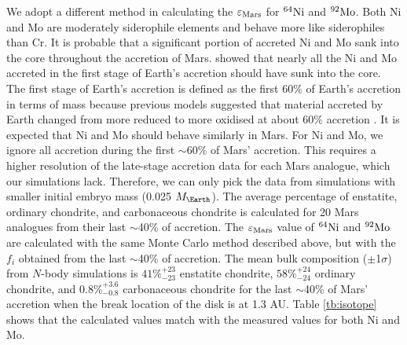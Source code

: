 \documentclass{aa}
\begin{document}
We adopt a different method in calculating the $\varepsilon_{\rm Mars}$ for $^{64} \rm Ni$ and $^{92} \rm Mo$. Both Ni and Mo are moderately siderophile elements and behave more like siderophiles than Cr. It is probable that a significant portion of accreted Ni and Mo sank into the core throughout the accretion of Mars. \cite{dauphas2017isotopic} showed that nearly all the Ni and Mo accreted in the first stage of Earth’s accretion should have sunk into the core. The first stage of Earth’s accretion is defined as the first 60$\%$ of Earth’s accretion in terms of mass because previous models suggested that material accreted by Earth changed from more reduced to more oxidised at about 60$\%$ accretion \citep{rubie2015accretion}. It is expected that Ni and Mo should behave similarly in Mars. For Ni and Mo, we ignore all accretion during the first $\sim$60\% of Mars’ accretion. This requires a higher resolution of the late-stage accretion data for each Mars analogue, which our simulations lack. Therefore, we can only pick the data from simulations with smaller initial embryo mass (0.025 $M_{\Earth}$). The average percentage of enstatite, ordinary chondrite, and carbonaceous chondrite is calculated for 20 Mars analogues from their last $\sim$40\% of accretion. The $\varepsilon_{\rm Mars}$ value of $^{64} \rm Ni$ and $^{92} \rm Mo$ are calculated with the same Monte Carlo method described above, but with the $f_i$ obtained from the last $\sim$40\% of accretion. The mean bulk composition ($\pm$1$\sigma$) from $N$-body simulations is $41\%^{+23}_{-23}$ enstatite chondrite, $58\%^{+24}_{-24}$ ordinary chondrite, and $0.8\%^{+3.6}_{-0.8}$ carbonaceous
chondrite for the last $\sim$40\% of Mars' accretion when the break location of the disk is at 1.3 AU. Table \ref{tb:isotope} shows that the calculated values match with the measured values for both Ni and Mo. 

\end{document}
